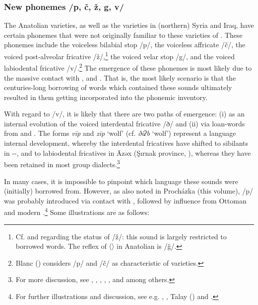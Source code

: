 \documentclass[output=paper]{langsci/langscibook}
\begin{document}
\subsubsection{New phonemes /p, \v{c}, ž, g, v/}\label{newsounds}
The Anatolian  varieties, as well as the varieties in (northern) Syria and Iraq, have certain phonemes that were not originally familiar to these varieties of . These phonemes include the voiceless bilabial stop /p/, the voiceless affricate /\v{c}/, the voiced post-alveolar fricative /ž/,\footnote{Cf. \cite{Jastrow2011anatolian} and \cite{GrigoreBituna2012} regarding the status of /ž/: this sound is largely restricted to borrowed words. The reflex of  〈{}〉 in Anatolian  is /\v{g}/.} the voiced velar stop /g/, and the voiced labiodental fricative /v/.\footnote{Blanc (\citeyear[6--7]{Blanc1964}) considers /p/ and /\v{c}/ as characteristic of  varieties.} The emergence of these phonemes is most likely due to the massive contact with ,  and . That is, the most likely scenario is that the centuries-long borrowing of words which contained these sounds ultimately resulted in them getting incorporated into the phonemic inventory.


With regard to /v/, it is likely that there are two paths of emergence: (i) as an internal evolution of the voiced interdental fricative /ð/ and (ii) via loan-words from  and . The forms \textit{vīp} and \textit{zīp} `wolf' (cf.  \textit{ðiʔb} `wolf') represent a language internal development, whereby the interdental fricatives have shifted to {sibilants} in --, and to labiodental fricatives in Āzəx (Şırnak province, \citealt{Wittrich2001}), whereas they have been retained in most  group dialects.\footnote{For more discussion, see \citet{Wittrich2001}, \citet{Jastrow2011anatolian}, \citet{Grigore2007article}, \citet{Talay2011}, \citet{Akkus2017}, and \cite{Bituna2016} among others. }

In many cases, it is impossible to pinpoint which language these sounds were (initially) borrowed from. However, as also noted in Proch\'{a}zka (this volume), /p/ was probably introduced via contact with , followed by influence from Ottoman and modern .\footnote{For further illustrations and discussion, see e.g. \citet{VockeWaldner1982}, \citet{Jastrow2011anatolian}, Talay (\citeyear{Talay2002,Talay2007}) and \citet{GrigoreBituna2012}.} Some illustrations are as follows:
\end{document}

